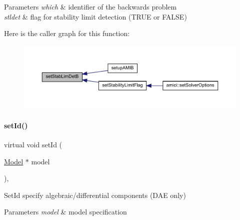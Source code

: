 \begin{DoxyParams}{Parameters}
{\em which} & identifier of the backwards problem \\
\hline
{\em stldet} & flag for stability limit detection (T\+R\+UE or F\+A\+L\+SE) \\
\hline
\end{DoxyParams}
Here is the caller graph for this function\+:
\nopagebreak
\begin{figure}[H]
\begin{center}
\leavevmode
\includegraphics[width=350pt]{classamici_1_1_solver_acb7f8ad7671faf5fa7e5fa7851e662ec_icgraph}
\end{center}
\end{figure}
\mbox{\label{classamici_1_1_solver_a5c1ec0904b36a63c3d8adc74ffbb3718}} 
\paragraph{\texorpdfstring{set\+Id()}{setId()}}
{\footnotesize\ttfamily virtual void set\+Id (\begin{DoxyParamCaption}\item[{\mbox{\hyperlink{classamici_1_1_model}{Model}} $\ast$}]{model }\end{DoxyParamCaption})\hspace{0.3cm}{\ttfamily [protected]}, {}}

Set\+Id specify algebraic/differential components (D\+AE only)


\begin{DoxyParams}{Parameters}
{\em model} & model specification \\
\hline
\end{DoxyParams}
\mbox{\label{classamici_1_1_solver_aaf6b0aa0540ff3600fdcc555f721e147}} 

